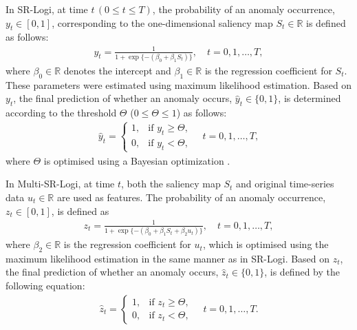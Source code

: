 \documentclass[pdflatex,sn-nature]{sn-jnl}
\theoremstyle{thmstyleone}%
\theoremstyle{thmstyletwo}%
\theoremstyle{thmstylethree}%
\begin{document}
In SR-Logi, at time $t\,(0 \le t \le T)$, the probability of an anomaly occurrence, \(y_t \in [0,1]\), corresponding to the one-dimensional saliency map \(S_t \in \mathbb{R}\) is defined as follows:
\begin{align}
    y_t = \frac{1}{1+\exp\{-(\beta_0+\beta_1 S_t)\}},\quad t=0,1,\dots,T,
\end{align}
where \(\beta_0 \in \mathbb{R}\) denotes the intercept and \(\beta_1 \in \mathbb{R}\) is the regression coefficient for \(S_t\).
These parameters were estimated using maximum likelihood estimation. 
Based on \(y_t\), the final prediction of whether an anomaly occurs, \(\hat{y}_t \in \{0,1\}\), is determined according to the threshold \(\Theta\) (\(0 \le \Theta \le 1\)) as follows:
\begin{align}
    \hat{y}_t =
        \begin{cases}
            1, & \text{if } y_t \ge \Theta, \\
            0, & \text{if } y_t < \Theta,
        \end{cases}
        \quad t=0,1,\dots,T,
\end{align}
where \(\Theta\) is optimised using a Bayesian optimization \cite{snoek2012practical}.

In Multi-SR-Logi, at time \(t\), both the saliency map \(S_t\) and original time-series data \(u_t \in \mathbb{R}\) are used as features. 
The probability of an anomaly occurrence, \(z_t \in [0,1]\), is defined as
\begin{align}
    z_t = \frac{1}{1+\exp\{-(\beta_0+\beta_1 S_t+\beta_2 u_t)\}},\quad t=0,1,\dots,T,
\end{align}
where \(\beta_2 \in \mathbb{R}\) is the regression coefficient for \(u_t\), which is optimised using the maximum likelihood estimation in the same manner as in SR-Logi. 
Based on \(z_t\), the final prediction of whether an anomaly occurs, \(\hat{z}_t \in \{0,1\}\), is defined by the following equation:
\vspace{-1ex}
\begin{align}
    \hat{z}_t =
    \begin{cases}
        1, & \text{if } z_t \ge \Theta, \\
        0, & \text{if } z_t < \Theta,
    \end{cases}
    \quad t=0,1,\dots,T.
\end{align}
\end{document}
